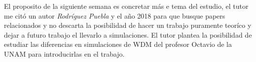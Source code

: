 El proposito de la siguiente semana es concretar más e tema del estudio, el tutor me citó un autor \textit{Rodríguez Puebla} y el año 2018 para que busque papers relacionados y no descarta la posibilidad de hacer un trabajo puramente teoríco y dejar a futuro trabajo el llevarlo a simulaciones. El tutor plantea la posibilidad de estudiar las diferencias en simulaciones de WDM del profesor Octavio de la UNAM para introducirlas en el trabajo.
